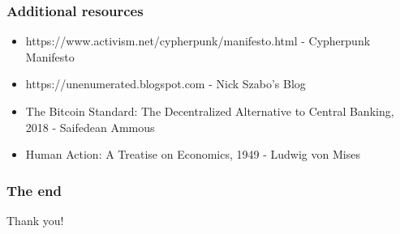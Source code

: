 \documentclass{beamer}
\begin{document}
\begin{frame}
  \frametitle{Additional resources}
  \begin{itemize}
  \item https://www.activism.net/cypherpunk/manifesto.html - Cypherpunk Manifesto
  \item https://unenumerated.blogspot.com - Nick Szabo's Blog
  \item The Bitcoin Standard: The Decentralized Alternative to Central Banking,
    2018 - Saifedean Ammous
  \item Human Action: A Treatise on Economics, 1949 - Ludwig von Mises
  \end{itemize}
\end{frame}

\begin{frame}
  \frametitle{The end}
  \begin{center}
    Thank you!
  \end{center}
\end{frame}
\end{document}
